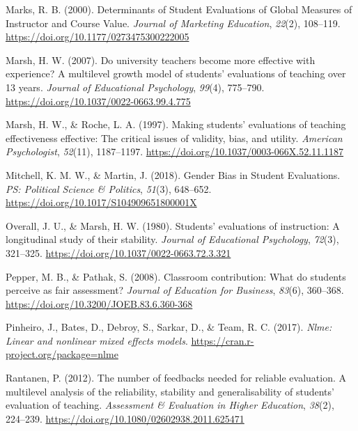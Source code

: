 \documentclass[
  man]{apa7}
\newlength{\cslhangindent}
\newlength{\cslentryspacingunit} %
\newenvironment{CSLReferences}[2] %
 {%
  \setlength{\parindent}{0pt}
  \ifodd #1
  \let\oldpar\par
  \def\par{\hangindent=\cslhangindent\oldpar}
  \fi
  \setlength{\parskip}{#2\cslentryspacingunit}
 }%
 {}
\begin{document}
\begin{CSLReferences}{1}{0}
\leavevmode{}%
Marks, R. B. (2000). Determinants of Student Evaluations of Global Measures of Instructor and Course Value. \emph{Journal of Marketing Education}, \emph{22}(2), 108--119. \url{https://doi.org/10.1177/0273475300222005}

\leavevmode{}%
Marsh, H. W. (2007). Do university teachers become more effective with experience? A multilevel growth model of students' evaluations of teaching over 13 years. \emph{Journal of Educational Psychology}, \emph{99}(4), 775--790. \url{https://doi.org/10.1037/0022-0663.99.4.775}

\leavevmode{}%
Marsh, H. W., \& Roche, L. A. (1997). Making students' evaluations of teaching effectiveness effective: The critical issues of validity, bias, and utility. \emph{American Psychologist}, \emph{52}(11), 1187--1197. \url{https://doi.org/10.1037/0003-066X.52.11.1187}

\leavevmode{}%
Mitchell, K. M. W., \& Martin, J. (2018). Gender Bias in Student Evaluations. \emph{PS: Political Science \& Politics}, \emph{51}(3), 648--652. \url{https://doi.org/10.1017/S104909651800001X}

\leavevmode{}%
Overall, J. U., \& Marsh, H. W. (1980). Students' evaluations of instruction: A longitudinal study of their stability. \emph{Journal of Educational Psychology}, \emph{72}(3), 321--325. \url{https://doi.org/10.1037/0022-0663.72.3.321}

\leavevmode{}%
Pepper, M. B., \& Pathak, S. (2008). Classroom contribution: What do students perceive as fair assessment? \emph{Journal of Education for Business}, \emph{83}(6), 360--368. \url{https://doi.org/10.3200/JOEB.83.6.360-368}

\leavevmode{}%
Pinheiro, J., Bates, D., Debroy, S., Sarkar, D., \& Team, R. C. (2017). \emph{Nlme: Linear and nonlinear mixed effects models}. \url{https://cran.r-project.org/package=nlme}

\leavevmode{}%
Rantanen, P. (2012). The number of feedbacks needed for reliable evaluation. A multilevel analysis of the reliability, stability and generalisability of students{'} evaluation of teaching. \emph{Assessment \& Evaluation in Higher Education}, \emph{38}(2), 224--239. \url{https://doi.org/10.1080/02602938.2011.625471}


\end{CSLReferences}
\end{document}
